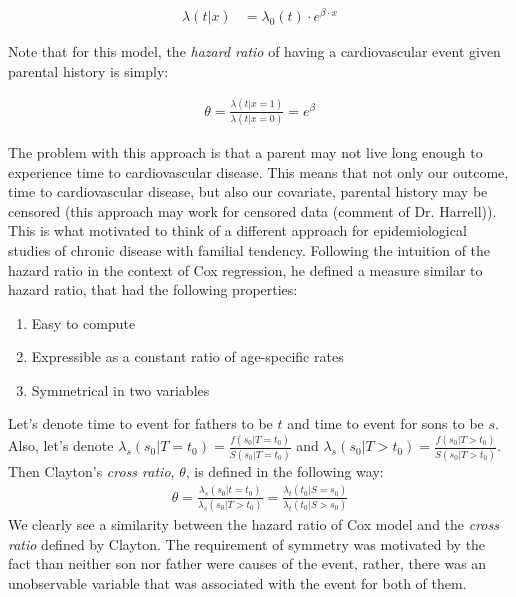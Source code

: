 \documentclass[]{article}
\begin{document}
$$
\begin{aligned}
	\lambda(t|x) &= \lambda_0(t) \cdot e^{\beta\cdot x}
\end{aligned}
$$

Note that for this model, the \emph{hazard ratio} of having a cardiovascular event given parental history is simply:

$$
\begin{aligned}
 \theta = \frac{\lambda(t|x=1)}{\lambda(t|x=0)} = e^{\beta}
 \end{aligned}
$$
 
The problem with this approach is that a parent may not live long enough to experience time to cardiovascular disease. This means that not only our outcome, time to cardiovascular disease, but also our covariate, parental history may be censored (this approach may work for censored data (comment of Dr. Harrell)). This is what motivated \cite{clayton1978model} to think of a different approach for epidemiological studies of chronic disease with familial tendency. Following the intuition of the hazard ratio in the context of Cox regression, he defined a measure similar to hazard ratio, that had the following properties:
\begin{enumerate}
	\item Easy to compute
	\item Expressible as a constant ratio of age-specific rates
  \item Symmetrical in two variables
\end{enumerate}
Let's denote time to event for fathers to be $t$ and time to event for sons to be $s$. Also, let's denote $\lambda_s(s_0|T=t_0) = \frac{f(s_0|T=t_0)}{S(s_0|T=t_0)}$ and $\lambda_s(s_0|T>t_0) = \frac{f(s_0|T>t_0)}{S(s_0|T>t_0)}$. Then Clayton's \emph{cross ratio}, $\theta$, is defined in the following way:
$$
\begin{aligned}
	\theta = \frac{\lambda_s(s_0|t=t_0)}{\lambda_s(s_0|T>t_0)} = \frac{\lambda_t(t_0|S=s_0)}{\lambda_t(t_0|S>s_0)}
\end{aligned}
$$
We clearly see a similarity between the hazard ratio of Cox model and the \emph{cross ratio} defined by Clayton. The requirement of symmetry was motivated by the fact than neither son nor father were causes of the event, rather, there was an unobservable variable that was associated with the event for both of them.\\
\end{document}

